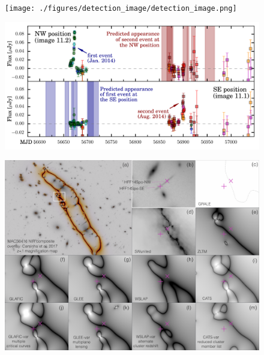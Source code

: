 
\begin{figure}[tbp]
\begin{center}
\texttt{[image: ./figures/detection\_image/detection\_image.png]}
\caption{ \protect}
\end{center}
\end{figure}



\begin{figure}[tbp]
  \begin{center}
    \includegraphics[width=\textwidth]{./figures/spock_predictions/spock_predictions}
    \caption{\protect}
  \end{center}
\end{figure}


\begin{figure}[tbp]
  \begin{center}
    \includegraphics[width=\textwidth]{./figures/spock_critical_curves/spock_critical_curves.png}
    \caption{\protect}
  \end{center}
\end{figure}

